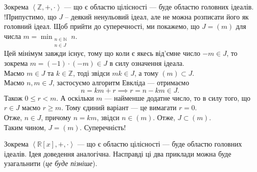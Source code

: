 \documentclass{math_library}
\begin{document}
\begin{example}
Зокрема $\left<\mathbb{Z},+,\cdot \right>$ --- що є областю цілісності --- буде областю головних ідеалів.
\bigskip \\
!Припустимо, що $J$ -- деякий ненульовий ідеал, але не можна розписати його як головний ідеал. Щоб прийти до суперечності, ми покажемо, що $J = (m)$ для числа $m = \displaystyle \min_{\substack{n \in \mathbb{N} \\ n \in J}} n$.\\
Цей мінімум завжди існує, тому що коли є якесь від'ємне число $-m \in J$, то зокрема $m = (-1) \cdot (-m) \in J$ в силу означення ідеала.\\
Маємо $m \in J$ та $k \in \mathbb{Z}$, тоді звідси $mk \in J$, а тому $(m) \subset J$.\\
Маємо $n,m \in J$, застосуємо алгоритм Евкліда --- отримаємо
\[
n = km + r \implies r = n - km \in J.
\]
Також $0 \leq r < m$. А оскільки $m$ --- найменше додатне число, то в силу того, що $r \in J$ маємо $r \geq m$. Тому єдиний варіант --- це вимагати $r = 0$.\\
Отже, $n \in J$, причому $n = km$, звідси $n \in (m)$. Отже, $J \subset (m)$.\\
Таким чином, $J = (m)$. Суперечність!
\end{example}

\begin{example}
Зокрема $\left<\mathbb{R}[x],+,\cdot \right>$ --- що є областю цілісності --- буде областю головних ідеалів. Ідея доведення аналогічна. Насправді ці два приклади можна буде узагальнити (\textit{це буде пізніше}).

\end{example}
\end{document}

